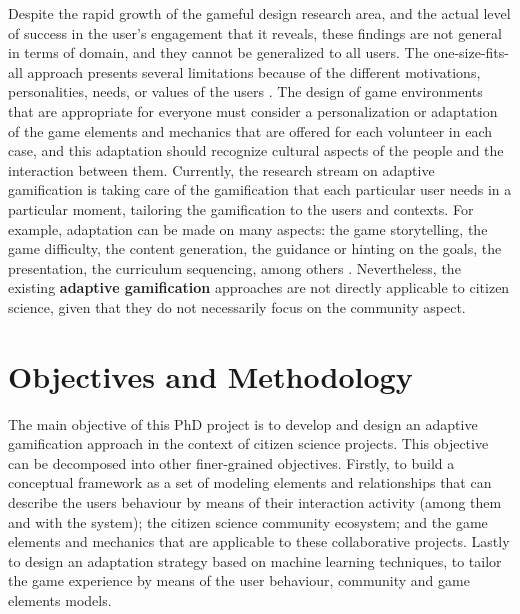 \documentclass[sigconf]{acmart}
\begin{document}
Despite the rapid growth of the gameful design research area, and the actual level of success in the user’s engagement that it reveals, these findings are not general in terms of domain, and they cannot be generalized to all users. The one-size-fits-all approach presents several limitations because of the different motivations, personalities, needs, or values of the users \cite{bockle_towards_2017}. The design of game environments that are appropriate for everyone must consider a personalization or adaptation of the game elements and mechanics that are offered  for each volunteer in each case, and this adaptation should recognize cultural aspects of the people and the interaction between them. Currently, the research stream on adaptive gamification is taking care of the gamification that each particular user needs in a particular moment, tailoring the gamification to the users and contexts\cite{klock2015gamification}. For example, adaptation can be made on many aspects: the game storytelling, the game difficulty, the content generation, the guidance or hinting on the goals, the presentation, the curriculum sequencing, among others \cite{gobel_personalization_2016}. Nevertheless, the existing \textbf{adaptive gamification} approaches are not directly applicable to citizen science, given that they do not necessarily focus on the community aspect.

\section{Objectives and Methodology}


The main objective of this PhD project is to develop and design an adaptive gamification approach in the context of citizen science projects. This objective can be decomposed into other finer-grained objectives. Firstly, to build a conceptual framework as a set of modeling elements and relationships that can describe the users behaviour by means of their interaction activity (among them and with the system); the citizen science community ecosystem; and the game elements and mechanics that are applicable to these collaborative projects. Lastly to design an adaptation strategy based on machine learning techniques, to tailor the game experience by means of the user behaviour, community and game elements models.
\end{document}
